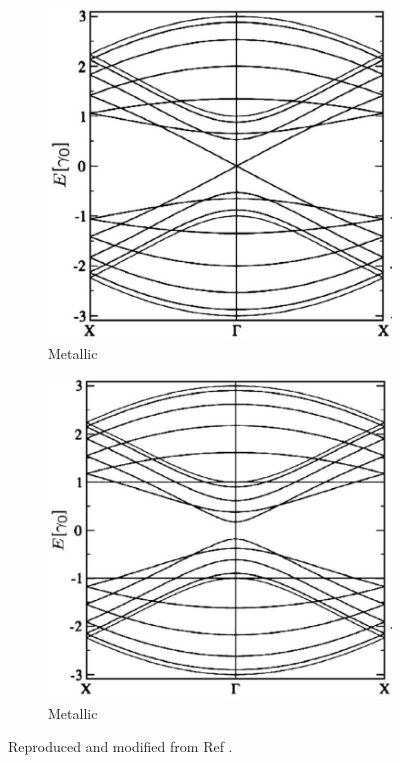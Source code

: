 \begin{figure}[h]
	\centering
	\begin{subfigure}{0.45\textwidth}
		\centering
		\includegraphics[scale=0.36]{images/chapter_optical_props/nine_zero_band_charlier_2}
		\caption{Metallic}
	\end{subfigure}
	\qquad
	\begin{subfigure}{0.45\textwidth}
		\centering
		\includegraphics[scale=0.38]{images/chapter_optical_props/ten_zero_band_charlier_2}
		\caption{Metallic}
	\end{subfigure}
	\caption{Reproduced and modified from Ref \cite{charlier2007electronic}.}
\end{figure}

